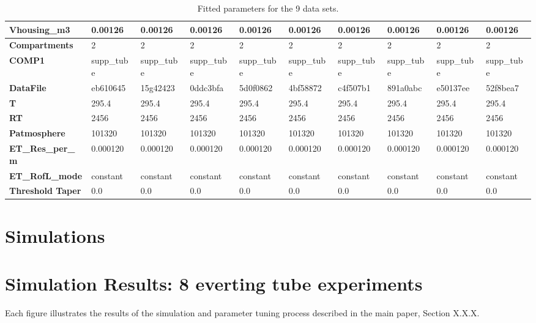 \documentclass[letterpaper]{article}
\begin{document}
\begin{landscape}
\begin{table}[!ht]
\begin{tabular}{|l|l|l|l|l|l|l|l|l|l|}
        \textbf{Vhousing\_m3} & 0.00126 & 0.00126 & 0.00126 & 0.00126 & 0.00126 & 0.00126 & 0.00126 & 0.00126 & 0.00126 \\ \hline
        \textbf{Compartments} & 2 & 2 & 2 & 2 & 2 & 2 & 2 & 2 & 2 \\ \hline
        \textbf{COMP1} & supp\_tube & supp\_tube & supp\_tube & supp\_tube & supp\_tube & supp\_tube & supp\_tube & supp\_tube & supp\_tube \\ \hline
        \textbf{DataFile} & eb610645 & 15g42423 & 0ddc3bfa & 5d0f0862 & 4bf58872 & c4f507b1 & 891a0abc & e50137ee & 52f8bea7 \\ \hline
        \textbf{T} & 295.4 & 295.4 & 295.4 & 295.4 & 295.4 & 295.4 & 295.4 & 295.4 & 295.4 \\ \hline
        \textbf{RT} & 2456 & 2456 & 2456 & 2456 & 2456 & 2456 & 2456 & 2456 & 2456 \\ \hline
        \textbf{Patmosphere} & 101320 & 101320 & 101320 & 101320 & 101320 & 101320 & 101320 & 101320 & 101320 \\ \hline
        \textbf{ET\_Res\_per\_m} & 0.000120 & 0.000120 & 0.000120 & 0.000120 & 0.000120 & 0.000120 & 0.000120 & 0.000120 & 0.000120 \\ \hline
        \textbf{ET\_RofL\_mode} & constant & constant & constant & constant & constant & constant & constant & constant & constant \\ \hline
        \textbf{Threshold Taper} & 0.0 & 0.0 & 0.0 & 0.0 & 0.0 & 0.0 & 0.0 & 0.0 & 0.0 \\ \hline
    \end{tabular}
    \caption{Fitted parameters for the 9 data sets.}
\end{table}
\clearpage
\end{landscape}

\section{Simulations}

\section{Simulation Results: 8 everting tube experiments}
Each figure illustrates the results of the simulation and parameter tuning process described in the main paper, Section X.X.X.
\vspace{0.5in}
\end{document}
